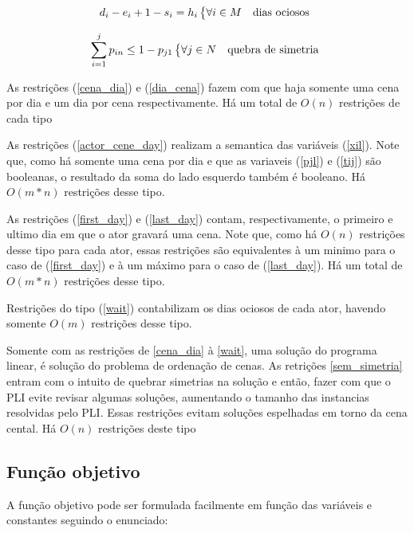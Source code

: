 \documentclass[a4paper,11pt]{article}
\begin{document}
\begin{equation}
  d_{i} - e_i + 1 - s_i = h_i \begin{dcases*} \forall i \in M & dias ociosos \end{dcases*}
  \label{wait}
\end{equation}

\begin{equation}
  \sum_{i=1}^j p_{in} \leq 1 - p_{j1} \begin{dcases*} \forall j \in N & quebra de simetria \end{dcases*}
  \label{sem_simetria}
\end{equation}

As restrições (\ref{cena_dia}) e (\ref{dia_cena}) fazem com que haja somente uma
cena por dia e um dia por cena respectivamente. Há um total de $O(n)$ restrições
de cada tipo

As restrições (\ref{actor_cene_day}) realizam a semantica das variáveis (\ref{xil}).
Note que, como há somente uma cena por dia e que as variaveis (\ref{pjl}) e (\ref{tij})
são booleanas, o resultado da soma do lado esquerdo também é booleano. Há $O(m*n)$
restrições desse tipo.

As restrições (\ref{first_day}) e (\ref{last_day}) contam, respectivamente, o
primeiro e ultimo dia em que o ator gravará uma cena. Note que, como há $O(n)$
restrições desse tipo para cada ator, essas restrições são equivalentes à um
minimo para o caso de (\ref{first_day}) e à um máximo para o caso de (\ref{last_day}).
Há um total de $O(m*n)$ restrições desse tipo.

Restrições do tipo (\ref{wait}) contabilizam os dias ociosos de cada ator, havendo
somente $O(m)$ restrições desse tipo.

Somente com as restrições de \ref{cena_dia} à \ref{wait}, uma solução do programa
linear, é solução do problema de ordenação de cenas. As retrições \ref{sem_simetria}
entram com o intuito de quebrar simetrias na solução e então, fazer com que o PLI
evite revisar algumas soluções, aumentando o tamanho das instancias resolvidas pelo PLI.
Essas restrições evitam soluções espelhadas em torno da cena cental. Há $O(n)$ restrições
deste tipo

\subsection{Função objetivo}
A função objetivo pode ser formulada facilmente em função das variáveis e constantes
seguindo o enunciado:
\end{document}
